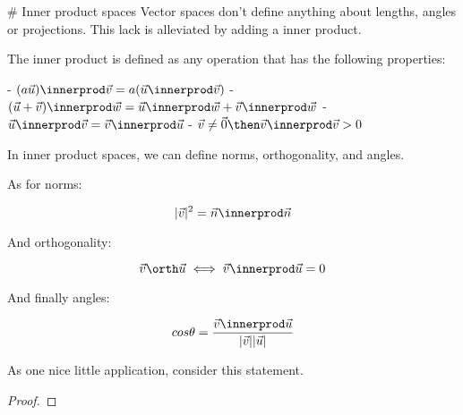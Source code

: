 \begin{theorem}
\end{theorem}

\begin{theorem}
\end{theorem}









# Inner product spaces
Vector spaces don't define anything about lengths, angles or projections. This lack is alleviated by adding a inner product. 

\begin{definition} The inner product is defined as any operation that has the following properties:

    - $(a\vec{u}) \innerprod \vec{v} = a (\vec{u} \innerprod \vec{v}) $
    - $(\vec{u} + \vec{v}) \innerprod \vec{w} = \vec{u} \innerprod \vec{w} + \vec{v} \innerprod \vec{w}$
    - $\vec{u} \innerprod \vec{v} = \vec{v} \innerprod \vec{u}$
    - $\vec{v} \neq \vec{0} \then \vec{v} \innerprod \vec{v} > 0$

\end{definition}

In inner product spaces, we can define norms, orthogonality, and angles. 

As for norms:

$$ |\vec{v}|^2 = \vec{n} \innerprod \vec{n} $$

And orthogonality:

$$ \vec{v} \orth \vec{u} \iff \vec{v} \innerprod \vec{u} = 0$$

And finally angles: 

$$ cos\theta = \frac{\vec{v} \innerprod \vec{u}}{|\vec{v}||\vec{u}|}$$



As one nice little application, consider this statement. 
\begin{proof}
\end{proof}

